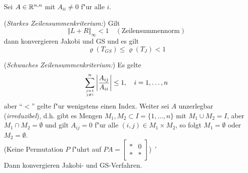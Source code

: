 \documentclass{scrartcl}
\begin{document}
\begin{Satz} Sei $A \in \mathbb{R}^{n,n}$ mit $A_{ii} \neq 0$ f"ur alle $i$.
\begin{iaufz}
\item (\emph{Starkes Zeilensummenkriterium:}) Gilt
$$ \Vert L + R \Vert_{\infty} < 1 \quad (\mathrm{Zeilensummennorm})$$
dann konvergieren Jakobi und GS und es gilt
$$ \varrho(T_{GS}) \leq \varrho(T_J) < 1$$
\item (\emph{Schwaches Zeilensummenkriterium:}) Es gelte 
$$ \sum\limits_{\genfrac{}{}{0pt}{}{j=1}{j \neq i}}^n \left\vert \frac{A_{ij}}{A_{ii}} \right\vert \leq 1, \quad i=1, \ldots, n$$
aber "`$<$"' gelte f"ur wenigstens einen Index. Weiter sei $A$ unzerlegbar (\emph{irreduzibel}), d.h. gibt es Mengen $M_1, M_2 \subset I = \{ 1, \ldots, n \}$ mit $M_1 \cup M_2 = I$, aber $M_1 \cap M_2 = \emptyset$ und gilt $A_{ij} = 0$ f"ur alle $(i,j) \in M_1 \times M_2$, so folgt $M_1 = \emptyset$ oder $M_2 = \emptyset$. \\
(Keine Permutation $P$ f"uhrt auf $PA = \left[ \begin{smallmatrix} * & 0 \\ * & * \end{smallmatrix} \right]$) ´\\
Dann konvergieren Jakobi- und GS-Verfahren.
\end{iaufz}
\end{Satz}
\end{document}
